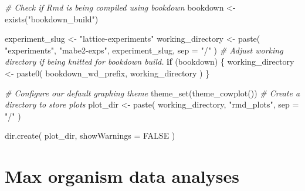 \documentclass[
]{book}
\newenvironment{Shaded}{\begin{snugshade}}{\end{snugshade}}
\newcommand{\AttributeTok}[1]{\textcolor[rgb]{0.77,0.63,0.00}{#1}}
\newcommand{\CommentTok}[1]{\textcolor[rgb]{0.56,0.35,0.01}{\textit{#1}}}
\newcommand{\ConstantTok}[1]{\textcolor[rgb]{0.00,0.00,0.00}{#1}}
\newcommand{\ControlFlowTok}[1]{\textcolor[rgb]{0.13,0.29,0.53}{\textbf{#1}}}
\newcommand{\FunctionTok}[1]{\textcolor[rgb]{0.00,0.00,0.00}{#1}}
\newcommand{\NormalTok}[1]{#1}
\newcommand{\OtherTok}[1]{\textcolor[rgb]{0.56,0.35,0.01}{#1}}
\newcommand{\StringTok}[1]{\textcolor[rgb]{0.31,0.60,0.02}{#1}}
\begin{document}
\begin{Shaded}
\begin{Highlighting}[]
\CommentTok{\# Check if Rmd is being compiled using bookdown}
\NormalTok{bookdown }\OtherTok{\textless{}{-}} \FunctionTok{exists}\NormalTok{(}\StringTok{"bookdown\_build"}\NormalTok{)}
\end{Highlighting}
\end{Shaded}

\begin{Shaded}
\begin{Highlighting}[]
\NormalTok{experiment\_slug }\OtherTok{\textless{}{-}} \StringTok{"lattice{-}experiments"}
\NormalTok{working\_directory }\OtherTok{\textless{}{-}} \FunctionTok{paste}\NormalTok{(}
  \StringTok{"experiments"}\NormalTok{,}
  \StringTok{"mabe2{-}exps"}\NormalTok{,}
\NormalTok{  experiment\_slug,}
  \AttributeTok{sep =} \StringTok{"/"}
\NormalTok{)}
\CommentTok{\# Adjust working directory if being knitted for bookdown build.}
\ControlFlowTok{if}\NormalTok{ (bookdown) \{}
\NormalTok{  working\_directory }\OtherTok{\textless{}{-}} \FunctionTok{paste0}\NormalTok{(}
\NormalTok{    bookdown\_wd\_prefix,}
\NormalTok{    working\_directory}
\NormalTok{  )}
\NormalTok{\}}
\end{Highlighting}
\end{Shaded}

\begin{Shaded}
\begin{Highlighting}[]
\CommentTok{\# Configure our default graphing theme}
\FunctionTok{theme\_set}\NormalTok{(}\FunctionTok{theme\_cowplot}\NormalTok{())}
\CommentTok{\# Create a directory to store plots}
\NormalTok{plot\_dir }\OtherTok{\textless{}{-}} \FunctionTok{paste}\NormalTok{(}
\NormalTok{  working\_directory,}
  \StringTok{"rmd\_plots"}\NormalTok{,}
  \AttributeTok{sep =} \StringTok{"/"}
\NormalTok{)}

\FunctionTok{dir.create}\NormalTok{(}
\NormalTok{  plot\_dir,}
  \AttributeTok{showWarnings =} \ConstantTok{FALSE}
\NormalTok{)}
\end{Highlighting}
\end{Shaded}

\hypertarget{max-organism-data-analyses-1}{%
\section{Max organism data analyses}\label{max-organism-data-analyses-1}}
\end{document}
